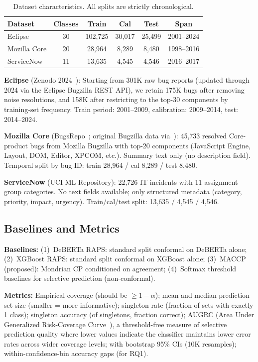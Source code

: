 \documentclass[conference]{IEEEtran}
\begin{document}
\begin{table}[t]
\caption{Dataset characteristics. All splits are strictly chronological.}
\label{tab:datasets}
\centering
\footnotesize
\setlength{\tabcolsep}{3pt}
\begin{tabular}{@{}lccccc@{}}
\toprule
\textbf{Dataset} & \textbf{Classes} & \textbf{Train} & \textbf{Cal} & \textbf{Test} & \textbf{Span} \\
\midrule
Eclipse     & 30 & 102{,}725 & 30{,}017 & 25{,}499 & 2001--2024 \\
Mozilla Core & 20 & 28{,}964 & 8{,}289 & 8{,}480 & 1998--2016 \\
ServiceNow  & 11 & 13{,}635 & 4{,}545 & 4{,}546 & 2016--2017 \\
\bottomrule
\end{tabular}
\end{table}

\textbf{Eclipse} (Zenodo 2024~\cite{lamkanfi2013eclipse}): Starting from 301K raw bug reports (updated through 2024 via the Eclipse Bugzilla REST API), we retain 175K bugs after removing noise resolutions, and 158K after restricting to the top-30 components by training-set frequency. Train period: 2001--2009, calibration: 2009--2014, test: 2014--2024.

\textbf{Mozilla Core} (BugsRepo~\cite{acharya2025bugsrepo}; original Bugzilla data via~\cite{lamkanfi2013eclipse}): 45{,}733 resolved Core-product bugs from Mozilla Bugzilla with top-20 components (JavaScript Engine, Layout, DOM, Editor, XPCOM, etc.). Summary text only (no description field). Temporal split by bug ID: train 28{,}964 / cal 8{,}289 / test 8{,}480.

\textbf{ServiceNow} (UCI ML Repository): 22,726 IT incidents with 11 assignment group categories. No text fields available; only structured metadata (category, priority, impact, urgency). Train/cal/test split: 13,635 / 4,545 / 4,546.

\subsection{Baselines and Metrics}

\textbf{Baselines:}
(1)~DeBERTa RAPS: standard split conformal on DeBERTa alone;
(2)~XGBoost RAPS: standard split conformal on XGBoost alone;
(3)~MACCP (proposed): Mondrian CP conditioned on agreement;
(4)~Softmax threshold baselines for selective prediction (non-conformal).

\textbf{Metrics:}
Empirical coverage (should be $\geq 1 - \alpha$);
mean and median prediction set size (smaller = more informative);
singleton rate (fraction of sets with exactly 1 class);
singleton accuracy (of singletons, fraction correct);
AUGRC (Area Under Generalized Risk-Coverage Curve~\cite{traub2024augrc}), a threshold-free measure of selective prediction quality where lower values indicate the classifier maintains lower error rates across wider coverage levels; with bootstrap 95\% CIs (10K resamples);
within-confidence-bin accuracy gaps (for RQ1).
\end{document}
